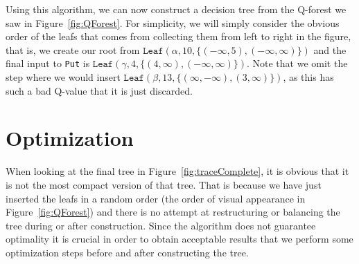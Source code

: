 \documentclass{article}
\begin{document}
Using this algorithm, we can now construct a decision tree from the Q-forest we
saw in Figure~\ref{fig:QForest}. For simplicity, we will simply consider the
obvious order of the leafs that comes from collecting them from left to right in
the figure, that is, we create our root from $\texttt{Leaf}(\alpha, 10, \{
(-\infty, 5), (-\infty, \infty) \})$ and the final input to \texttt{Put} is
$\texttt{Leaf}(\gamma, 4, \{ (4, \infty), (-\infty, \infty) \})$. Note that we
omit the step where we would insert $\texttt{Leaf}(\beta, 13, \{ (\infty,
-\infty), (3, \infty) \})$, as this has such a bad Q-value that it is just
discarded.

    
\section{Optimization}

When looking at the final tree in Figure~\ref{fig:traceComplete}, it is obvious
that it is not the most compact version of that tree. That is because we have
just inserted the leafs in a random order (the order of visual appearance in
Figure~\ref{fig:QForest}) and there is no attempt at restructuring or balancing
the tree during or after construction. Since the algorithm does not guarantee
optimality it is crucial in order to obtain acceptable results that we perform
some optimization steps before and after constructing the tree.
\end{document}
